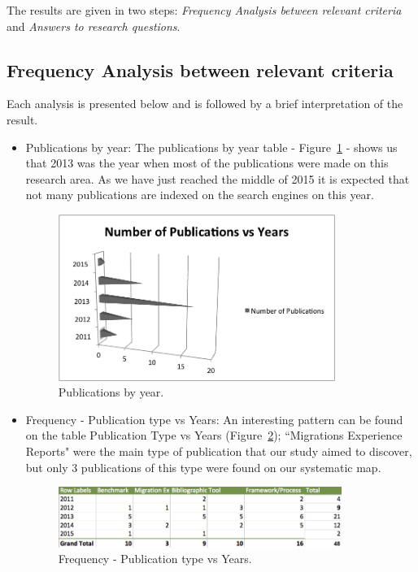 \documentclass[conference, 10pt, a4paper]{IEEEtran}
\begin{document}
The results are given in two steps: \textit{Frequency Analysis between relevant criteria} and \textit{Answers to research questions}. 

\subsection{Frequency Analysis between relevant criteria}
\label{frequencyAnalysis}

Each analysis is presented below and is followed by a brief interpretation of the result. 



\begin{itemize}
\item{Publications by year: }
The publications by year table - Figure~\ref{fig:pubByYear} -  shows us that 2013 was the year when most of the publications were made on this research area. As we have just reached  the middle of 2015 it is expected that not many publications are indexed on the search engines on this year.
\begin{figure}[htb!]
\centering
\includegraphics[width=90mm]{graph2.png}
\caption{Publications by year.\label{fig:pubByYear}}
\end{figure}



\item {Frequency - Publication type vs Years: }
An interesting pattern can be found on the table Publication Type vs Years (Figure~\ref{fig:pubTypeVsYears}); ``Migrations Experience Reports" were the main type of publication that our study aimed to discover, but only 3 publications of this type were found on our systematic map. 

\begin{figure}[htb!]
\centering
\includegraphics[width=92mm]{graph1.png}
\caption{Frequency - Publication type vs Years.\label{fig:pubTypeVsYears}}
\end{figure}



\end{itemize}
\end{document}
